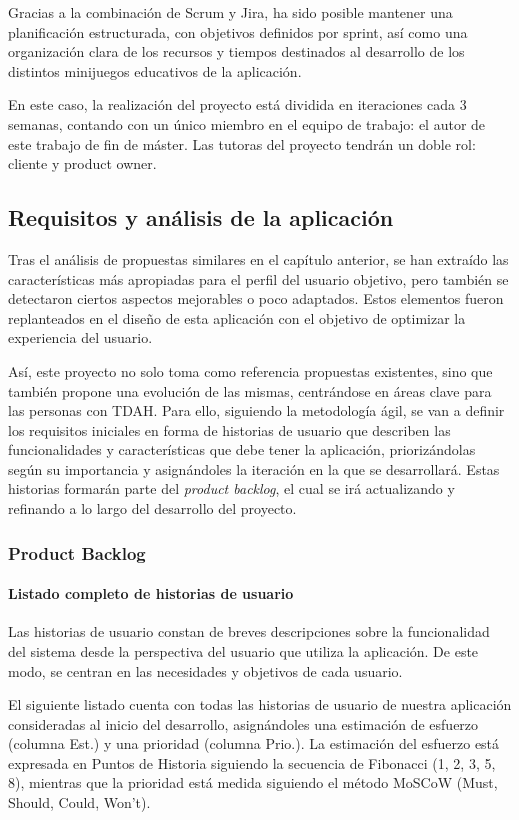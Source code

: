 Gracias a la combinación de Scrum y Jira, ha sido posible mantener una planificación estructurada, con objetivos definidos por sprint, así como una organización clara de los recursos y tiempos destinados al desarrollo de los distintos minijuegos educativos de la aplicación.

En este caso, la realización del proyecto está dividida en iteraciones cada 3 semanas, contando con un único miembro en el equipo de trabajo: el autor de este trabajo de fin de máster.
Las tutoras del proyecto tendrán un doble rol: cliente y product owner.

\subsection{Requisitos y análisis de la aplicación}
Tras el análisis de propuestas similares en el capítulo anterior, se han extraído las características más apropiadas para el perfil del usuario objetivo, pero también se detectaron ciertos aspectos mejorables o poco adaptados. 
Estos elementos fueron replanteados en el diseño de esta aplicación con el objetivo de optimizar la experiencia del usuario.

Así, este proyecto no solo toma como referencia propuestas existentes, sino que también propone una evolución de las mismas, centrándose en áreas clave para las personas con TDAH.
Para ello, siguiendo la metodología ágil, se van a definir los requisitos iniciales en forma de historias de usuario que describen las funcionalidades y características que debe tener la aplicación, priorizándolas según su importancia y asignándoles la iteración en la que se desarrollará.
Estas historias formarán parte del \textit{product backlog}, el cual se irá actualizando y refinando a lo largo del desarrollo del proyecto.

\subsubsection{Product Backlog}

\paragraph{Listado completo de historias de usuario}
Las historias de usuario constan de breves descripciones sobre la funcionalidad del sistema desde la perspectiva del usuario que utiliza la aplicación. 
De este modo, se centran en las necesidades y objetivos de cada usuario.

El siguiente listado cuenta con todas las historias de usuario de nuestra aplicación consideradas al inicio del desarrollo, asignándoles una estimación de esfuerzo (columna Est.) y una prioridad (columna Prio.). 
La estimación del esfuerzo está expresada en Puntos de Historia siguiendo la secuencia de Fibonacci (1, 2, 3, 5, 8), mientras que la prioridad está medida siguiendo el método MoSCoW (Must, Should, Could, Won’t).
	
